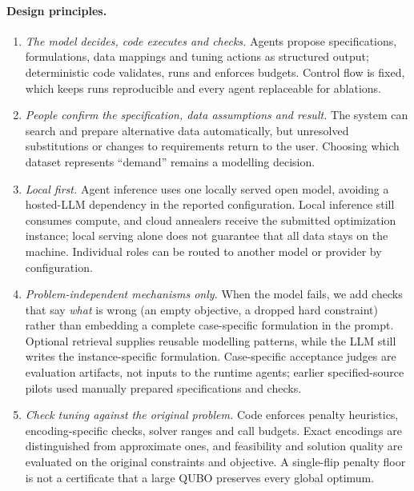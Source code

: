 \paragraph{Design principles.}
\begin{enumerate}
  \item \emph{The model decides, code executes and checks.} Agents propose specifications, formulations, data
        mappings and tuning actions as structured output; deterministic code validates, runs and enforces budgets.
        Control flow is fixed, which keeps runs reproducible and every agent replaceable for ablations.
  \item \emph{People confirm the specification, data assumptions and result.} The system can search and prepare
        alternative data automatically, but unresolved substitutions or changes to requirements return to the
        user. Choosing which dataset represents ``demand'' remains a modelling decision.
  \item \emph{Local first.} Agent inference uses one locally served open model, avoiding a hosted-LLM dependency in the
        reported configuration. Local inference still consumes compute, and cloud annealers receive the
        submitted optimization instance; local serving alone does not guarantee that all data stays on the
        machine. Individual roles can be routed to another model or provider by configuration.
  \item \emph{Problem-independent mechanisms only.} When the model fails, we add checks that say \emph{what} is
        wrong (an empty objective, a dropped hard constraint) rather than embedding a complete case-specific formulation in the prompt. Optional retrieval supplies
        reusable modelling patterns, while the LLM still writes the instance-specific formulation.
        Case-specific acceptance judges are evaluation artifacts, not inputs to the runtime agents; earlier
        specified-source pilots used manually prepared specifications and checks.
  \item \emph{Check tuning against the original problem.} Code enforces penalty heuristics, encoding-specific
        checks, solver ranges and call budgets. Exact encodings are distinguished from approximate ones, and
        feasibility and solution quality are evaluated on the original constraints and objective. A
        single-flip penalty floor is not a certificate that a large QUBO preserves every global optimum.
\end{enumerate}
